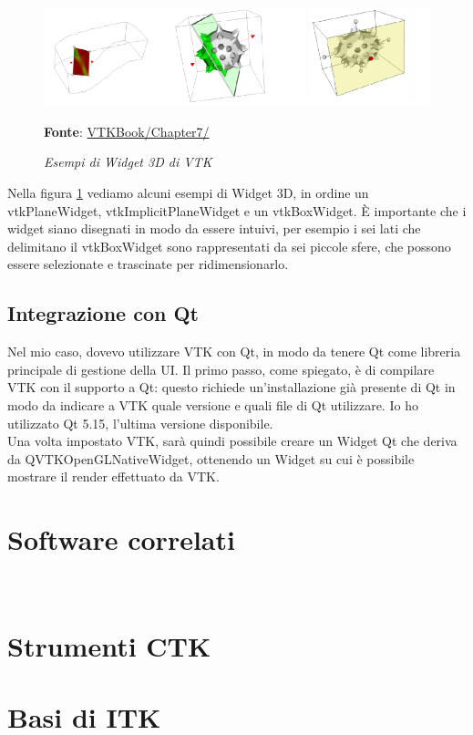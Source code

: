 \begin{figure}[h]
    \centering
    \includegraphics[scale=0.5]{immagini/volumerendering/widgets.png}
    \caption{\textit{Esempi di Widget 3D di VTK}}
    \textbf{Fonte}: \href{https://lorensen.github.io/VTKExamples/site/VTKBook/07Chapter7/}{VTKBook/Chapter7/}
    \label{fig: VTK 3D Widgets}
\end{figure}

Nella figura \ref{fig: VTK 3D Widgets} vediamo alcuni esempi di Widget 3D, in ordine un vtkPlaneWidget, vtkImplicitPlaneWidget e un vtkBoxWidget. \`E importante che i widget siano disegnati in modo da essere intuivi, per esempio i sei lati che delimitano il vtkBoxWidget sono rappresentati da sei piccole sfere, che possono essere selezionate e trascinate per ridimensionarlo.

\subsection{Integrazione con Qt}\label{sec:qt-integrazione}
Nel mio caso, dovevo utilizzare VTK con Qt, in modo da tenere Qt come libreria principale di gestione della UI. Il primo passo, come spiegato, è di compilare VTK con il supporto a Qt: questo richiede un'installazione già presente di Qt in modo da indicare a VTK quale versione e quali file di Qt utilizzare. Io ho utilizzato Qt 5.15, l'ultima versione disponibile.\\
Una volta impostato VTK, sarà quindi possibile creare un Widget Qt che deriva da QVTKOpenGLNativeWidget, ottenendo un Widget su cui è possibile mostrare il render effettuato da VTK.

\section{Software correlati}
\\

\section{Strumenti CTK}

\section{Basi di ITK}

